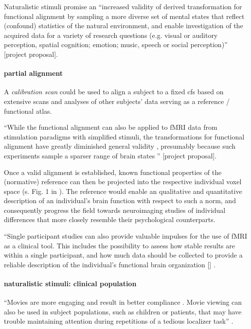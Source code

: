 %
Naturalistic stimuli promise an ``increased validity of derived transformation
for functional alignment by sampling a more diverse set of mental states that
reflect (confound) statistics of the natural environment, and enable
investigation of the acquired data for a variety of research questions (e.g.
visual or auditory perception, spatial cognition; emotion; music, speech or
social perception)'' [project proposal].


\paragraph{partial alignment}
%
A \textit{calibration scan} could be used to align a subject to a fixed \ac{cfs}
based on extensive scans and analyses of other subjects' data serving as a
reference / functional atlas.

``While the functional alignment can also be applied to fMRI data from
stimulation paradigms with simplified stimuli, the transformations for
functional alignment have greatly diminished general validity
\citep{haxby2011common}, presumably because such experiments sample a sparser
range of brain states \citep{guntupalli2016model}'' [project proposal].

%
Once a valid alignment is established, known functional properties of the
(normative) reference can then be projected into the respective individual voxel
space (s. Fig. 1 in \citep{nishimoto2016lining}).
%
The reference would enable an qualitative and quantitative description of an
individual's brain function with respect to such a norm, and consequently
progress the field towards neuroimaging studies of individual differences that
more closely resemble their psychological counterparts.

%
``Single participant studies can also provide valuable impulses for the use of
fMRI as a clinical tool.
%
This includes the possibility to assess how stable results are within a single
participant, and how much data should be collected to provide a reliable
description of the individual’s functional brain organization
[\citet{laumann2015functional, gordon2017precision}] \citep{wegrzyn2018thought}.


\paragraph{naturalistic stimuli: clinical population}
%
``Movies are more engaging and result in better compliance
\citep{vanderwal2015inscapes}. Movie viewing can also be used in subject
populations, such as children \citep{richardson2018development} or patients,
that may have trouble maintaining attention during repetitions of a tedious
localizer task'' \citep{jiahui2020predicting}.


